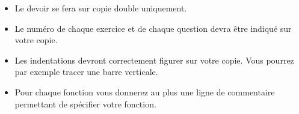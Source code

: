 \begin{itemize}
\item Le devoir se fera sur copie double uniquement.
\item Le numéro de chaque exercice et de chaque question devra être indiqué sur votre copie.
\item Les indentations devront correctement figurer sur votre copie. Vous pourrez par exemple tracer une barre verticale.
\item Pour chaque fonction vous donnerez au plus une ligne de commentaire permettant de spécifier votre fonction.
\end{itemize}